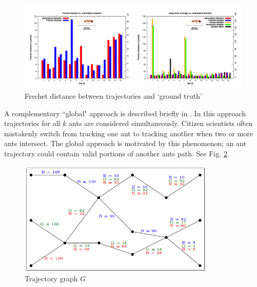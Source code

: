 \documentclass[12pt]{article}
\begin{document}
\begin{figure}
\centering
\includegraphics[width = 6.2in]{AntsJU.png}
\caption{Frechet distance between trajectories and `ground truth' \cite{Joy12}}
\label{fig:ALocal}
\end{figure}

\indent A complementary ``global" approach is described briefly in \cite{Joy12}. In this approach trajectories for all $k$ ants are considered simultaneously. Citizen scientists often mistakenly switch from tracking one ant to tracking another when two or more ants intersect. The global approach is motivated by this phenomenon; an ant trajectory could contain valid portions of another ants path. See Fig. \ref{fig:AGraph}.

\begin{figure}[h!]
\centering
\includegraphics[width = 3.7in]{Antgraph.png}
\caption{Trajectory graph $G$ \cite{Joy12}}
\label{fig:AGraph}
\end{figure}

\end{document}
